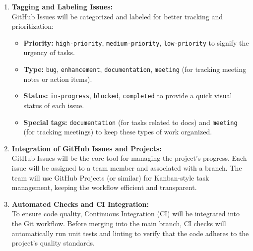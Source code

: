 \documentclass{article}
\begin{document}
\begin{enumerate}
    \item \textbf{Tagging and Labeling Issues:} \\
    GitHub Issues will be categorized and labeled for better tracking and prioritization:
    \begin{itemize}
        \item \textbf{Priority:} \texttt{high-priority}, \texttt{medium-priority}, \texttt{low-priority} to signify the urgency of tasks.
        \item \textbf{Type:} \texttt{bug}, \texttt{enhancement}, \texttt{documentation}, \texttt{meeting} (for tracking meeting notes or action items).
        \item \textbf{Status:} \texttt{in-progress}, \texttt{blocked}, \texttt{completed} to provide a quick visual status of each issue.
        \item \textbf{Special tags:} \texttt{documentation} (for tasks related to docs) and \texttt{meeting} (for tracking meetings) to keep these types of work organized.
    \end{itemize}
    
    \item \textbf{Integration of GitHub Issues and Projects:} \\
    GitHub Issues will be the core tool for managing the project’s progress. Each issue will be assigned to a team member and associated with a branch. The team will use GitHub Projects (or similar) for Kanban-style task management, keeping the workflow efficient and transparent.
    
    \item \textbf{Automated Checks and CI Integration:} \\
    To ensure code quality, Continuous Integration (CI) will be integrated into the Git workflow. Before merging into the main branch, CI checks will automatically run unit tests and linting to verify that the code adheres to the project's quality standards.
\end{enumerate}
\end{document}
